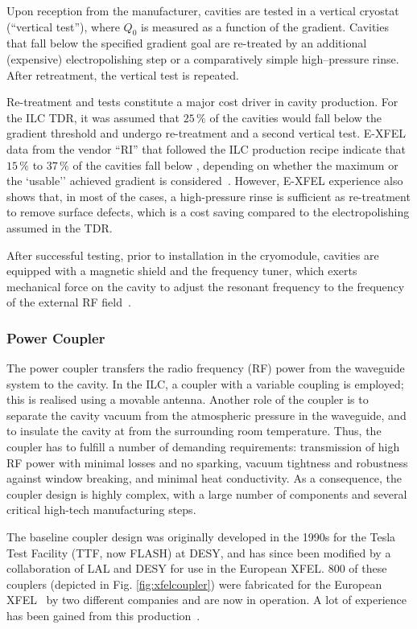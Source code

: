 Upon reception from the manufacturer, cavities are tested in a vertical cryostat (``vertical test''), where $Q_0$ is measured as a function of the gradient.
Cavities that fall below the specified gradient goal are re-treated by an additional (expensive) electropolishing step or a comparatively simple high--pressure rinse. 
After retreatment, the vertical test is repeated.

Re-treatment and tests constitute a major cost driver in cavity production. 
For the ILC TDR, it was assumed that $25\,\%$ of the cavities would fall below the  gradient threshold and undergo re-treatment and a second vertical test.
E-XFEL data from the vendor ``RI'' that followed the ILC production recipe indicate that $15\,\%$ to $37\,\%$ of the cavities fall below , depending  on whether the maximum or the `usable'' achieved gradient is considered~\cite{bib:Walker:2017.lcws}.
However, E-XFEL experience also shows that, in most of the cases, a high-pressure rinse is sufficient as re-treatment to remove surface defects, which is a cost saving compared to the electropolishing assumed in the TDR.

After successful testing, prior to installation in the cryomodule, cavities are equipped with a magnetic shield and the frequency tuner, which exerts mechanical force on the cavity to adjust the resonant frequency to the frequency of the external RF field~\cite[Sect. 3.3]{Adolphsen:2013kya}.  


\subsubsection{Power Coupler}

The power coupler transfers the radio frequency (RF) power from the waveguide system to the cavity. 
In the ILC, a coupler with a variable coupling is employed; this is realised using  a movable antenna.  Another role of the coupler is to 
separate the cavity vacuum from the atmospheric pressure in the waveguide, and to  insulate the cavity at  from the surrounding room temperature.
Thus,  the coupler has to fulfill a number of demanding requirements: transmission of high RF power with minimal losses and no sparking, vacuum tightness and robustness against window breaking, and minimal heat conductivity.  
As a consequence, the coupler design is highly complex, with a large number of components and several critical high-tech manufacturing steps.

The baseline coupler design was originally developed in the 1990s for the Tesla Test Facility (TTF, now FLASH) at DESY,
and has since been modified by a collaboration of LAL and DESY for use in the European XFEL.
$800$ of these couplers (depicted in Fig. \ref{fig:xfelcoupler}) were fabricated for the European XFEL~\cite{Kaabi:2013wna} by two different companies and are now in operation.
A lot of experience has been gained from this production~\cite{Sierra:2017wyc}.



